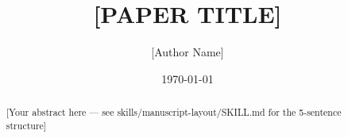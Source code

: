 \documentclass[12pt]{article}
\title{[PAPER TITLE]}
\author{[Author Name]}
\date{\today}
\theoremstyle{remark}
\begin{document}
\maketitle

\begin{abstract}
[Your abstract here — see skills/manuscript-layout/SKILL.md for the 5-sentence structure]
\end{abstract}

%   



\end{document}
